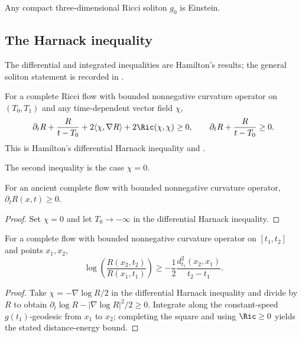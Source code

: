 \begin{theorem}
\label{thm:ricci-soliton-einstein-dimension-three}
\label{ivey}
Any compact three-dimensional Ricci soliton $g_0$ is Einstein.
\end{theorem}

\subsection{The Harnack inequality}
The differential and integrated inequalities are Hamilton's results; the
general soliton statement is recorded in \cite{Ivey}.
\begin{theorem}
\label{thm:hamilton-harnack-inequality}
\label{Harnack}
For a complete Ricci flow with bounded nonnegative curvature operator on
$(T_0,T_1)$ and any time-dependent vector field $\chi$,
\[
\partial_tR+\frac{R}{t-T_0}+2\langle\chi,\nabla R\rangle+2\Ric(\chi,\chi)\ge0,
\qquad \partial_tR+\frac{R}{t-T_0}\ge0.
\]
This is Hamilton's differential Harnack inequality \cite{Hamiltonharnack} and
\cite{Hamiltonharnack}.
\end{theorem}
\begin{remark}
\label{rem:harnack-inequality-zero-field-case}

The second inequality is the case $\chi=0$.
\end{remark}

\begin{corollary}
\label{cor:ancient-flow-scalar-curvature-nondecreasing}
\label{posderiv}
For an ancient complete flow with bounded nonnegative curvature operator,
$\partial_tR(x,t)\ge0$.
\end{corollary}
\begin{proof}
\sketch Set $\chi=0$ and let $T_0\to-\infty$ in the differential Harnack
inequality.
\end{proof}

\begin{theorem}
\label{thm:harnack-inequality-integrated}
\label{Harnack2}
For a complete flow with bounded nonnegative curvature operator on
$[t_1,t_2]$ and points $x_1,x_2$,
\[
\log\left(\frac{R(x_2,t_2)}{R(x_1,t_1)}\right)
\ge-\frac12\frac{d_{t_1}^2(x_2,x_1)}{t_2-t_1}.
\]
\end{theorem}
\begin{proof}
\sketch Take $\chi=-\nabla\log R/2$ in the differential Harnack inequality and
divide by $R$ to obtain
$\partial_t\log R-|\nabla\log R|^2/2\ge0$. Integrate along the constant-speed
$g(t_1)$-geodesic from $x_1$ to $x_2$; completing the square and using
$\Ric\ge0$ yields the stated distance-energy bound.
\end{proof}
